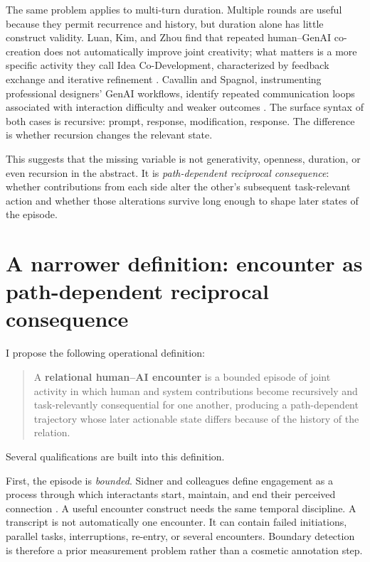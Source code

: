 \documentclass[11pt]{article}
\begin{document}
The same problem applies to multi-turn duration. Multiple rounds are useful because they permit recurrence and history, but duration alone has little construct validity. Luan, Kim, and Zhou find that repeated human--GenAI co-creation does not automatically improve joint creativity; what matters is a more specific activity they call Idea Co-Development, characterized by feedback exchange and iterative refinement \citep{LuanKimZhou2025Augmented}. Cavallin and Spagnol, instrumenting professional designers' GenAI workflows, identify repeated communication loops associated with interaction difficulty and weaker outcomes \citep{CavallinSpagnol2026Sweat}. The surface syntax of both cases is recursive: prompt, response, modification, response. The difference is whether recursion changes the relevant state.

This suggests that the missing variable is not generativity, openness, duration, or even recursion in the abstract. It is \emph{path-dependent reciprocal consequence}: whether contributions from each side alter the other's subsequent task-relevant action and whether those alterations survive long enough to shape later states of the episode.

\section{A narrower definition: encounter as path-dependent reciprocal consequence}

I propose the following operational definition:

\begin{quote}
A \textbf{relational human--AI encounter} is a bounded episode of joint activity in which human and system contributions become recursively and task-relevantly consequential for one another, producing a path-dependent trajectory whose later actionable state differs because of the history of the relation.
\end{quote}

Several qualifications are built into this definition.

First, the episode is \emph{bounded}. Sidner and colleagues define engagement as a process through which interactants start, maintain, and end their perceived connection \citep{SidnerEtAl2005Engagement}. A useful encounter construct needs the same temporal discipline. A transcript is not automatically one encounter. It can contain failed initiations, parallel tasks, interruptions, re-entry, or several encounters. Boundary detection is therefore a prior measurement problem rather than a cosmetic annotation step.
\end{document}
